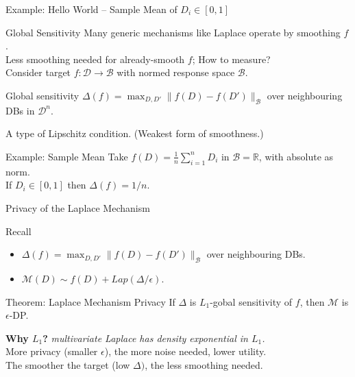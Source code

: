 \documentclass{beamer}
\newcommand{\reals}{\ensuremath{\mathbb{R}}\xspace}
\newcommand{\cB}{\ensuremath{\mathcal{B}}\xspace}
\newcommand{\cD}{\ensuremath{\mathcal{D}}\xspace}
\newcommand{\mech}{\ensuremath{\mathcal{M}}\xspace}
\newcommand{\domain}{\ensuremath{\cD}\xspace}
\begin{document}
\begin{frame}{Example: Hello World -- Sample Mean of $D_i\in [0,1]$}
\end{frame}

\begin{frame}{Global Sensitivity}
Many generic mechanisms like Laplace operate by smoothing $f$. \\
Less smoothing needed for already-smooth $f$; How to measure? \\[1em]

Consider target $f: \domain \to \cB$ with \alert{normed response space} \cB.

\pause
\begin{alertblock}{Global sensitivity}
$\Delta(f) = \max_{D,D'} \|f(D) - f(D')\|_\cB$ over neighbouring DBs in $\domain^n$.
\end{alertblock}
A type of Lipschitz condition. (Weakest form of smoothness.)

\begin{exampleblock}{Example: Sample Mean}
Take $f(D)=\frac{1}{n}\sum_{i=1}^n D_i$ in $\cB=\mathbb{R}$, with absolute as norm. \\
If $D_i\in[0,1]$ then $\Delta(f)= 1/n$.
\end{exampleblock}
\end{frame}

\begin{frame}{Privacy of the Laplace Mechanism}

Recall
\begin{itemize}
\item $\Delta(f) = \max_{D,D'} \|f(D) - f(D')\|_\cB$ over neighbouring DBs.
\item $\mech(D) \sim f(D) + Lap(\Delta / \epsilon)$.	
\end{itemize}
\begin{alertblock}{Theorem: Laplace Mechanism Privacy}
	If $\Delta$ is $L_1$-gobal sensitivity of $f$, then $\mech$ is \alert{$\epsilon$-DP.} %
\end{alertblock}
\textbf{Why $L_1$?} \textit{multivariate Laplace has density exponential in $L_1$.} \\[1.0em]

\pause
More privacy (smaller $\epsilon$), the more noise needed, lower utility. \\
The smoother the target (low $\Delta)$, the less smoothing needed.

\end{frame}
\end{document}
